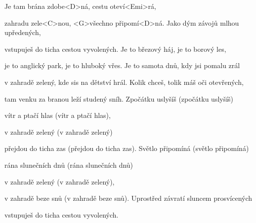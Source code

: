 

\zs
Je tam brána zdobe<D>ná, cestu oteví<Emi>rá,

zahradu zele<C>nou, <G>všechno připomí<D>ná.
\ks
\zs
Jako dým závojů mlhou upředených,

vstupuješ do ticha cestou vyvolených.
\ks
\zs
Je to březový háj, je to borový les,

je to anglický park, je to hluboký vřes.
\ks
\zs
Je to samota dnů, kdy jsi pomalu zrál

v zahradě zelený, kde sis na dětství hrál.
\ks
\zs
Kolik chceš, tolik máš oči otevřených,

tam venku za branou leží studený sníh.
\ks
\zs
Zpočátku uslyšíš (zpočátku uslyšíš)

vítr a ptačí hlas (vítr a ptačí hlas),

v zahradě zelený (v zahradě zelený)

přejdou do ticha zas (přejdou do ticha zas).
\ks
\zs
Světlo připomíná (světlo připomíná)

rána slunečních dnů (rána slunečních dnů)

v zahradě zelený (v zahradě zelený),

v zahradě beze snů (v zahradě beze snů).
\ks
\zs
Uprostřed závratí sluncem prosvícených

vstupuješ do ticha cestou vyvolených.
\ks
\kp
